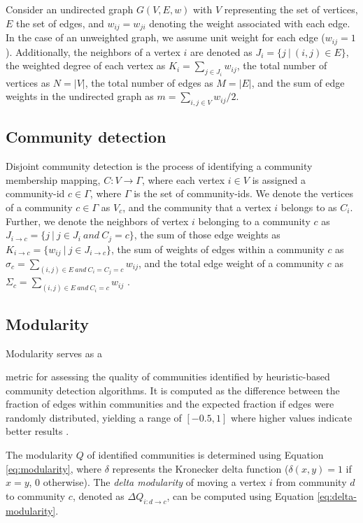 Consider an undirected graph $G(V, E, w)$ with $V$ representing the set of vertices, $E$ the set of edges, and $w_{ij} = w_{ji}$ denoting the weight associated with each edge. In the case of an unweighted graph, we assume unit weight for each edge ($w_{ij} = 1$). Additionally, the neighbors of a vertex $i$ are denoted as $J_i = \{j\ |\ (i, j) \in E\}$, the weighted degree of each vertex as $K_i = \sum_{j \in J_i} w_{ij}$, the total number of vertices as $N = |V|$, the total number of edges as $M = |E|$, and the sum of edge weights in the undirected graph as $m = \sum_{i, j \in V} w_{ij}/2$.




\subsection{Community detection}

Disjoint community detection is the process of identifying a community membership mapping, $C: V \rightarrow \Gamma$, where each vertex $i \in V$ is assigned a community-id $c \in \Gamma$, where $\Gamma$ is the set of community-ids. We denote the vertices of a community $c \in \Gamma$ as $V_c$, and the community that a vertex $i$ belongs to as $C_i$. Further, we denote the neighbors of vertex $i$ belonging to a community $c$ as $J_{i \rightarrow c} = \{j\ |\ j \in J_i\ and\ C_j = c\}$, the sum of those edge weights as $K_{i \rightarrow c} = \{w_{ij}\ |\ j \in J_{i \rightarrow c}\}$, the sum of weights of edges within a community $c$ as $\sigma_c = \sum_{(i, j) \in E\ and\ C_i = C_j = c} w_{ij}$, and the total edge weight of a community $c$ as $\Sigma_c = \sum_{(i, j) \in E\ and\ C_i = c} w_{ij}$ \cite{com-leskovec21}.




\subsection{Modularity}

Modularity serves as a metric for assessing the quality of communities identified by heuristic-based community detection algorithms. It is computed as the difference between the fraction of edges within communities and the expected fraction if edges were randomly distributed, yielding a range of $[-0.5, 1]$ where higher values indicate better results \cite{com-brandes07}. The modularity $Q$ of identified communities is determined using Equation \ref{eq:modularity}, where $\delta$ represents the Kronecker delta function ($\delta (x,y)=1$ if $x=y$, $0$ otherwise). The \textit{delta modularity} of moving a vertex $i$ from community $d$ to community $c$, denoted as $\Delta Q_{i: d \rightarrow c}$, can be computed using Equation \ref{eq:delta-modularity}.

